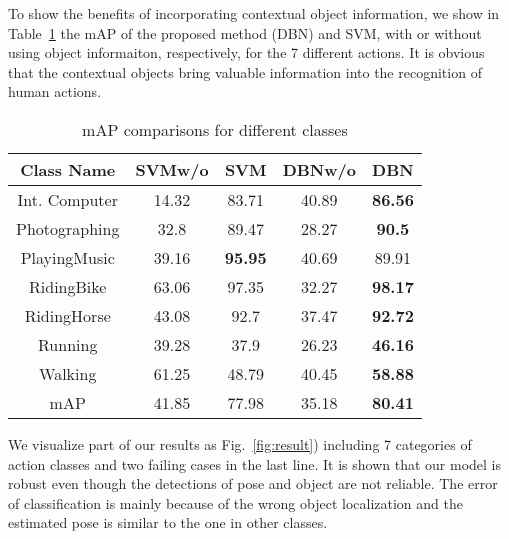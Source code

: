 \documentclass{article}
\begin{document}
To show the benefits of incorporating contextual object information, we show in Table~\ref{tab:mAP} the mAP of the proposed method (DBN) and SVM, with or without using object informaiton, respectively, for the 7 different actions.  It is obvious that the contextual objects bring valuable information into the recognition of human actions.

\begin{table}[htpb]

  \centering

  \caption{mAP comparisons for different classes}

    \begin{tabular}{ccccc}

    \toprule

    Class Name & SVMw/o & SVM   & DBNw/o & DBN \\

    \midrule

    Int. Computer & 14.32 & 83.71 & 40.89 & \textbf{86.56} \\

    Photographing & 32.8  & 89.47 & 28.27 & \textbf{90.5} \\

    PlayingMusic & 39.16 & \textbf{95.95} & 40.69 & 89.91 \\

    RidingBike & 63.06 & 97.35 & 32.27 & \textbf{98.17} \\

    RidingHorse & 43.08 & 92.7  & 37.47 & \textbf{92.72} \\

    Running & 39.28 & 37.9  & 26.23 & \textbf{46.16} \\

    Walking & 61.25 & 48.79 & 40.45 & \textbf{58.88} \\

    mAP   & 41.85 & 77.98 & 35.18 & \textbf{80.41} \\

    \bottomrule

    \end{tabular}%

  \label{tab:mAP}%

\end{table}%

We visualize part of our results as Fig.~\ref{fig:result}) including 7 categories of action classes and two failing cases in the last line. It is shown that our model is robust even though the detections of pose and object are not reliable.  The error of classification is mainly because of the wrong object localization and the estimated pose is similar to the one in other classes.
\end{document}
